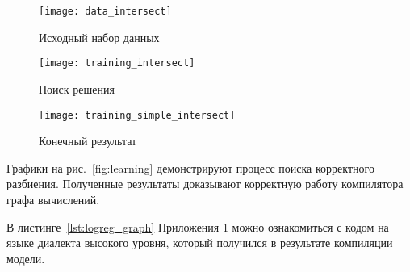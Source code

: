 \begin{sidewaysfigure}[ht]
  \begin{subfigure}{.33\textwidth}
    \centering
    \texttt{[image: data\_intersect]}
    \caption{Исходный набор данных}
  \end{subfigure}
  \begin{subfigure}{.33\textwidth}
    \centering
    \texttt{[image: training\_intersect]}
    \caption{Поиск решения}
  \end{subfigure}
  \begin{subfigure}{.33\textwidth}
    \centering
    \texttt{[image: training\_simple\_intersect]}
    \caption{Конечный результат}
  \end{subfigure}
  \caption{Процесс обучения модели}
  \label{fig:learning}
\end{sidewaysfigure}

Графики на рис.~\ref{fig:learning} демонстрируют процесс поиска корректного
разбиения. Полученные результаты доказывают корректную работу компилятора
графа вычислений.

В листинге~\ref{lst:logreg_graph} Приложения 1 можно ознакомиться с кодом на 
языке диалекта высокого уровня, который получился в результате компиляции модели.
